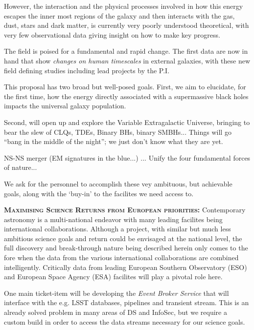 \documentclass[oneside, a4paper, onecolumn, 11pt]{article}
\begin{document}
However, the interaction and the physical processes involved in how
this energy escapes the inner most regions of the galaxy and then
interacts with the gas, dust, stars and dark matter, is currently very
poorly understood theoretical, with very few observational data giving
insight on how to make key progress.

The field is poised for a fundamental and rapid change. The first data are now in hand 
that show {\it changes on human timescales} in external galaxies, with these new 
field defining studies including lead projects by the P.I. 

This proposal has two broad but well-posed goals. 
First, we aim to elucidate, for the first time, how the energy directly associated with a 
supermassive black holes impacts the universal galaxy population.  

Second, will open up and explore the Variable Extragalactic Universe, bringing to bear 
the slew of 
CLQs, TDEs, Binary BHs, binary SMBHs... 
Things will go ``bang in the middle of the night''; we just don't know what 
they are yet. 

NS-NS merger (EM signatures in the blue...) ...
Unify the four fundamental forces of nature...


We ask for the personnel to accomplish these vey ambituous, 
but achievable goals, along with the `buy-in' to the facilites we need access to. 



\smallskip
\smallskip
\noindent
\textbf{\textsc{Maximising Science Returns from European priorities:}}
Contemporary astronomy is a multi-national endeavor with many leading
facilites being international collaborations. Although a project, with
similar but much less ambitious science goals and return could be
envisaged at the national level, the full discovery and break-through
nature being described herein only comes to the fore when the data
from the various international collaborations are combined
intelligently.  Critically data from leading European Southern
Observatory (ESO) and European Space Agency (ESA) facilites will play
a pivotal role here.

\smallskip
\smallskip
\noindent
One main ticket-item will be developing the {\it Event Broker Service}
that will interface with the e.g. LSST databases, pipelines and
transient stream. This is an already solved problem in many areas 
of DS and InfoSec, but we require a custom build in order to access 
the data streams necessary for our science goals. 
\end{document}
